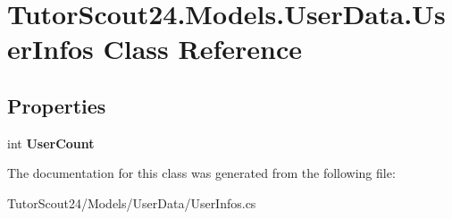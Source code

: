 \hypertarget{class_tutor_scout24_1_1_models_1_1_user_data_1_1_user_infos}{}\section{Tutor\+Scout24.\+Models.\+User\+Data.\+User\+Infos Class Reference}
\label{class_tutor_scout24_1_1_models_1_1_user_data_1_1_user_infos}
\subsection*{Properties}
\begin{DoxyCompactItemize}
\item 
\mbox{\label{class_tutor_scout24_1_1_models_1_1_user_data_1_1_user_infos_aa5998452d10199b6d575f0c162de7498}} 
int {\bfseries User\+Count}
\end{DoxyCompactItemize}


The documentation for this class was generated from the following file\+:\begin{DoxyCompactItemize}
\item 
Tutor\+Scout24/\+Models/\+User\+Data/User\+Infos.\+cs\end{DoxyCompactItemize}
